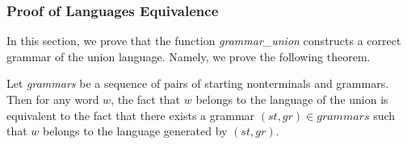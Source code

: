 


\subsubsection{Proof of Languages Equivalence}

In this section, we prove that the function \textit{grammar\_union} constructs a correct grammar of the union language. Namely, we prove the following theorem.

\begin{theorem} \label{theorem-correct-union}
    Let \textit{grammars} be a sequence of pairs of starting nonterminals and grammars. Then for any word $w$, the fact that $w$ belongs to the language of the union is equivalent to the fact that there exists a grammar $(st,gr) \in \textit{grammars}$ such that $w$ belongs to the language generated by $(st,gr)$.
\end{theorem}




